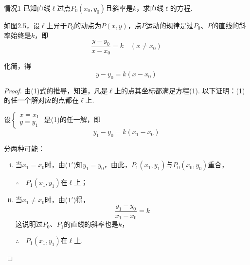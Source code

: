 \begin{thm}{情况1}
已知直线$\ell$过点$P_0(x_0,y_0)$且斜率是$k$，求直线$\ell$的方程.
\end{thm}

\noindent
\begin{minipage}{.55\textwidth}
\CTEXindent
如图2.5，设$\ell$上异于$P_0$的动点为$P(x,y)$，点$P$运动的规律是过$P_0$、$P$的直线的斜率始终是$k$，即
\[\frac{y-y_0}{x-x_0}=k\quad (x\ne x_0)\]

化简，得
\begin{equation}
    y-y_0=k(x-x_0) \tag{1}
\end{equation}
\end{minipage}
\hfill
\begin{minipage}{.4\textwidth}
\centering
{}
\end{minipage}

\begin{proof}
由(1)式的推导，知道，凡是$\ell$上的点其坐标都满足方程(1). 以下证明：(1)的任一个解对应的点都在$\ell$上.

设$\begin{cases}
    x=x_1\\y=y_1
\end{cases}$
是(1)的任一解，即
\begin{equation}
    y_1-y_0=k(x_1-x_0)\tag{$1'$}
\end{equation}

分两种可能：
\begin{enumerate}[(i)]
\item 当$x_1=x_0$时，由($1'$)知$y_1=y_0$，由此，$P_1(x_1,y_1)$与$P_0(x_0,y_0)$重合，

$\therefore\quad P_1(x_1,y_1)$在$\ell$上；
\item 当$x_1\ne x_0$时，由($1'$)得，
\[\frac{y_1-y_0}{x_1-x_0}=k\]
这说明过$P_0$、$P_1$的直线的斜率也是$k$，

$\therefore\quad P_1(x_1,y_1)$在$\ell$上.
\end{enumerate}
\end{proof}

